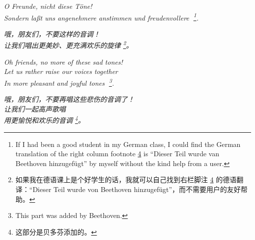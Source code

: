\begin{paracol}{4}
\begin{Gverse}
\itshape O Freunde, nicht diese T\"one! \\
Sondern la{\ss}t uns angenehmere anstimmen und freu\-denvollere
\footnote{If I had been a good student in my German class, I could find
the German translation of the right column footnote \ref{fn:right4} is
``Dieser Teil wurde van Beethoven hinzugef\"ugt'' by myself without
the kind help from a user.}.
\end{Gverse}
\begin{CGverse}
\itshape 哦，朋友们，不要这样的音调！ \\
让我们唱出更美妙、更充满欢乐的旋律%
\footnote{如果我在德语课上是个好学生的话，我就可以自己找到右栏脚注 \ref{fn:right4} 的德语翻译：“Dieser Teil wurde von Beethoven hinzugefügt”，而不需要用户的友好帮助。}。
\end{CGverse}
\begin{Everse}
\itshape Oh friends, no more of these sad tones!\\
Let us rather raise our voices together\\
In more pleasant and joyful tones
\footnote{This part was added by Beethoven.\label{fn:right4}}.
\end{Everse}
\begin{CEverse}
\itshape 哦，朋友们，不要再唱这些悲伤的音调了！\\
让我们一起高声歌唱\\
用更愉悦和欢乐的音调
\footnote{这部分是贝多芬添加的。\label{fn:right4}}。
\end{CEverse}



\end{paracol}
